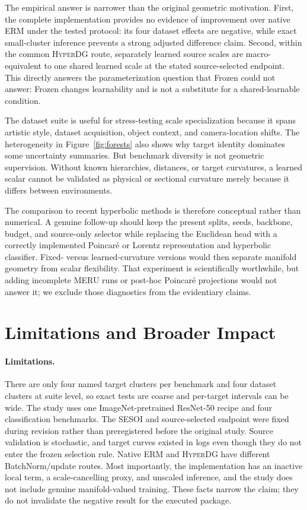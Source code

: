 \documentclass[10pt]{article}
\newcommand{\method}{\textsc{HyperDG}}
\begin{document}
The empirical answer is narrower than the original geometric motivation.
First, the complete implementation provides no evidence of improvement over
native ERM under the tested protocol: its four dataset effects are negative,
while exact
small-cluster inference prevents a strong adjusted difference claim. Second,
within the common \method{} route, separately learned source scales are
macro-equivalent to one shared learned scale at the stated source-selected
endpoint. This directly answers the parameterization question that Frozen
could not answer: Frozen changes learnability and is not a substitute for a
shared-learnable condition.

The dataset suite is useful for stress-testing scale specialization because it
spans artistic style, dataset acquisition, object context, and camera-location
shifts. The heterogeneity in Figure~\ref{fig:forests} also shows why target
identity dominates some uncertainty summaries. But benchmark diversity is not
geometric supervision. Without known hierarchies, distances, or target
curvatures, a learned scalar cannot be validated as physical or sectional
curvature merely because it differs between environments.

The comparison to recent hyperbolic methods is therefore conceptual rather
than numerical. A genuine follow-up should keep the present splits, seeds,
backbone, budget, and source-only selector while replacing the Euclidean head
with a correctly implemented Poincar\'e or Lorentz representation and
hyperbolic classifier. Fixed- versus learned-curvature versions would then
separate manifold geometry from scalar flexibility. That experiment is
scientifically worthwhile, but adding incomplete MERU runs or post-hoc
Poincar\'e projections would not answer it; we exclude those diagnostics from
the evidentiary claims.

\section{Limitations and Broader Impact}
\label{sec:limitations}

\paragraph{Limitations.}
There are only four named target clusters per benchmark and four dataset
clusters at suite level, so exact tests are coarse and per-target intervals can
be wide. The study uses one ImageNet-pretrained ResNet-50 recipe and four
classification benchmarks. The SESOI and source-selected endpoint were fixed
during revision rather than preregistered before the original study. Source
validation is stochastic, and target curves existed in logs even though they
do not enter the frozen selection rule. Native ERM and \method{} have different
BatchNorm/update routes. Most importantly, the implementation has an inactive
local term, a scale-cancelling proxy, and unscaled inference, and the study
does not include genuine manifold-valued training. These facts narrow the
claim; they do not invalidate the negative result for the executed package.
\end{document}

